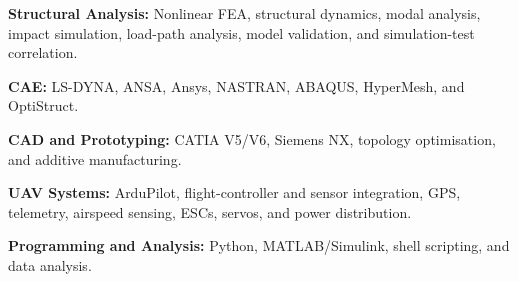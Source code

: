 \begin{cvitems}
  \item \textbf{Structural Analysis:} Nonlinear FEA, structural dynamics, modal analysis, impact simulation, load-path analysis, model validation, and simulation-test correlation.
  \item \textbf{CAE:} LS-DYNA, ANSA, Ansys, NASTRAN, ABAQUS, HyperMesh, and OptiStruct.
  \item \textbf{CAD and Prototyping:} CATIA V5/V6, Siemens NX, topology optimisation, and additive manufacturing.
  \item \textbf{UAV Systems:} ArduPilot, flight-controller and sensor integration, GPS, telemetry, airspeed sensing, ESCs, servos, and power distribution.
  \item \textbf{Programming and Analysis:} Python, MATLAB/Simulink, shell scripting, and data analysis.
\end{cvitems}
